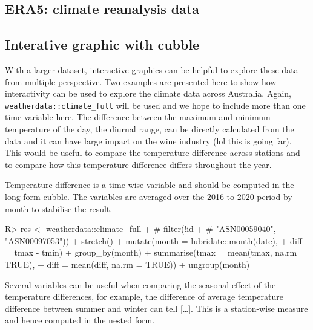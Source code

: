 \documentclass[
]{jss}
\begin{document}
\hypertarget{era5-climate-reanalysis-data}{%
\subsection{ERA5: climate reanalysis
data}\label{era5-climate-reanalysis-data}}

\newpage

\hypertarget{interative-graphic-with-cubble}{%
\subsection{Interative graphic with
cubble}\label{interative-graphic-with-cubble}}

With a larger dataset, interactive graphics can be helpful to explore
these data from multiple perspective. Two examples are presented here to
show how interactivity can be used to explore the climate data across
Australia. Again, \texttt{weatherdata::climate\_full} will be used and
we hope to include more than one time variable here. The difference
between the maximum and minimum temperature of the day, the diurnal
range, can be directly calculated from the data and it can have large
impact on the wine industry (lol this is going far). This would be
useful to compare the temperature difference across stations and to
compare how this temperature difference differs throughout the year.

Temperature difference is a time-wise variable and should be computed in
the long form cubble. The variables are averaged over the 2016 to 2020
period by month to stabilise the result.

\begin{CodeChunk}
\begin{CodeInput}
R> res <- weatherdata::climate_full %
+   # filter(!id %
+   #                   "ASN00059040", "ASN00097053")) %
+   stretch() %
+   mutate(month = lubridate::month(date),
+          diff = tmax - tmin) %
+   group_by(month) %
+   summarise(tmax = mean(tmax, na.rm = TRUE),
+             diff = mean(diff, na.rm = TRUE)) %
+   ungroup(month)
\end{CodeInput}
\end{CodeChunk}

Several variables can be useful when comparing the seasonal effect of
the temperature differences, for example, the difference of average
temperature difference between summer and winter can tell {[}\ldots{]}.
This is a station-wise measure and hence computed in the nested form.
\end{document}
